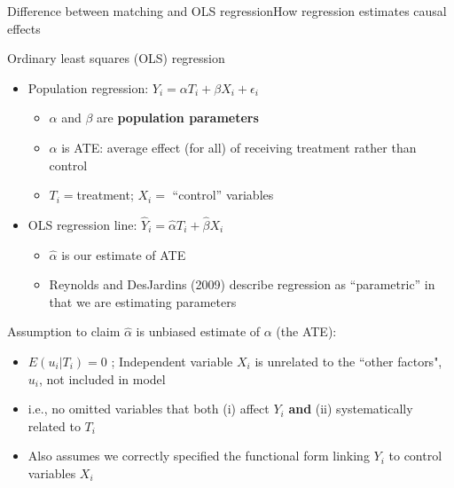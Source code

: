 \begin{frame}[shrink=10]{Difference between matching and OLS regression}{How regression estimates causal effects}

	Ordinary least squares (OLS) regression
	\begin{itemize}
		\item Population regression: $Y_i=\alpha T_i+\beta X_i + \epsilon_i$
		\begin{itemize}
			\item $\alpha$ and $\beta$ are \textbf{population parameters}
			\item $\alpha$ is ATE: average effect (for all) of receiving treatment rather than control
			\item $T_i=$treatment; $X_i=$ ``control'' variables
		\end{itemize}
		\item OLS regression line: $\hat{Y}_i=\hat{\alpha} T_i+\hat{\beta} X_i$
		\begin{itemize}
			\item $\hat{\alpha}$ is our estimate of ATE
			\item Reynolds and DesJardins (2009) describe regression as ``parametric'' in that we are estimating parameters
		\end{itemize}
	\end{itemize}
	\vspace{2mm}
	Assumption to claim $\hat{\alpha}$ is unbiased estimate of $\alpha$ (the ATE):
	\begin{itemize}
		\item $E(u_{i}|T_{i}) = 0$ ; Independent variable $X_{i}$ is unrelated to the ``other factors", $u_{i}$, not included in model
		\item i.e., no omitted variables that both (i) affect $Y_i$ \textbf{and} (ii) systematically related to $T_i$
		\item Also assumes we correctly specified the functional form linking $Y_i$ to control variables $X_i$
		
	\end{itemize}
\end{frame}

